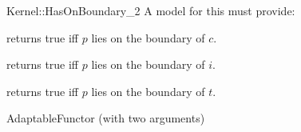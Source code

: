 \begin{ccRefFunctionObjectConcept}{Kernel::HasOnBoundary_2}
A model for this must provide:


{returns true iff $p$ lies on the boundary of $c$.}

{returns true iff $p$ lies on the boundary of $i$.}

{returns true iff $p$ lies on the boundary of $t$.}

\ccRefines
AdaptableFunctor (with two arguments)

\ccSeeAlso
{} \\
\\
\\

\end{ccRefFunctionObjectConcept}
